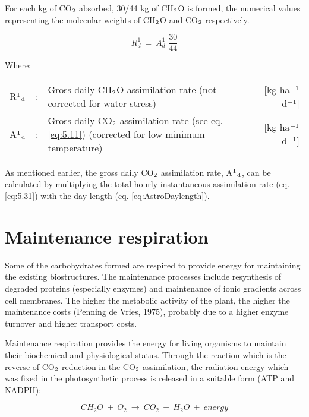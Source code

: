 For each kg of CO$_{{\rm 2}}$ absorbed, 30/44 kg of CH$_{{\rm 2}}$O is formed, the numerical values
representing the molecular weights of CH$_{{\rm 2}}$O and CO$_{{\rm 2}}$ respectively.

\begin{equation}
R _{d}^{1} ~=~ A _{d}^{1} \,\,{\frac{30}{44}}
\end{equation}

Where:\\[5pt]
\begin{tabularx}{\textwidth}{llXr}
	R$^{{\rm 1}}$$_{{\rm d}}$ &:& Gross daily CH$_{{\rm 2}}$O assimilation rate 
	(not corrected for water stress) &   [kg ha$^{{\rm -1}}$ d$^{{\rm -1}}$]\\
	A$^{{\rm 1}}$$_{{\rm d}}$ &:& Gross daily CO$_{{\rm 2}}$ assimilation rate 
	(see eq. \ref{eq:5.11}) (corrected for low minimum temperature)   &    [kg ha$^{{\rm -1}}$ d$^{{\rm -1}}$]\\   
\end{tabularx}

As mentioned earlier, the gross daily CO$_{{\rm 2}}$ assimilation rate, A$^{{\rm 1}}$$_{{\rm d}}$, 
can be calculated by multiplying the total hourly instantaneous assimilation rate (eq. \ref{eq:5.31}) 
with the day length (eq. \ref{eq:AstroDaylength}). 


\section{Maintenance respiration}

Some of the carbohydrates formed are respired to provide energy for maintaining the
existing biostructures. The maintenance processes include resynthesis of degraded proteins
(especially enzymes) and maintenance of ionic gradients across cell membranes. The
higher the metabolic activity of the plant, the higher the maintenance costs (Penning de
Vries, 1975), probably due to a higher enzyme turnover and higher transport costs.

Maintenance respiration provides the energy for living organisms to maintain their
biochemical and physiological status. Through the reaction which is the reverse of CO$_{{\rm 2}}$
reduction in the CO$_{{\rm 2}}$ assimilation, the radiation energy which was fixed in the
photosynthetic process is released in a suitable form (ATP and NADPH):

\begin{equation}
CH _{2} O ~+~ O _{2} ~\longrightarrow~ CO _{2} ~+~ H _{2} O ~+~ energy
\end{equation}

